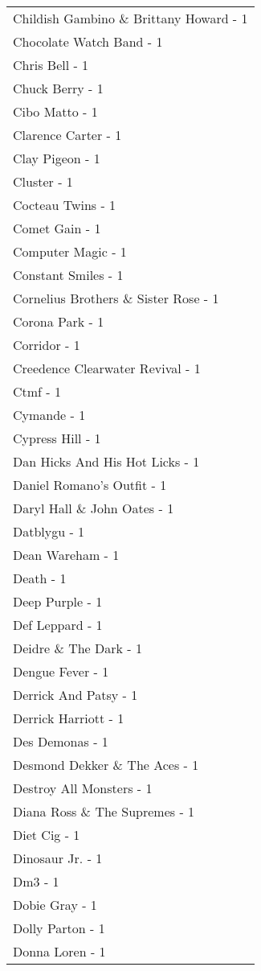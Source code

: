 \documentclass[
]{article}
\begin{document}
\begin{longtable}{l}
Childish Gambino \& Brittany Howard - 1 \\ 
Chocolate Watch Band - 1 \\ 
Chris Bell - 1 \\ 
Chuck Berry - 1 \\ 
Cibo Matto - 1 \\ 
Clarence Carter - 1 \\ 
Clay Pigeon - 1 \\ 
Cluster - 1 \\ 
Cocteau Twins - 1 \\ 
Comet Gain - 1 \\ 
Computer Magic - 1 \\ 
Constant Smiles - 1 \\ 
Cornelius Brothers \& Sister Rose - 1 \\ 
Corona Park - 1 \\ 
Corridor - 1 \\ 
Creedence Clearwater Revival - 1 \\ 
Ctmf - 1 \\ 
Cymande - 1 \\ 
Cypress Hill - 1 \\ 
Dan Hicks And His Hot Licks - 1 \\ 
Daniel Romano's Outfit - 1 \\ 
Daryl Hall \& John Oates - 1 \\ 
Datblygu - 1 \\ 
Dean Wareham - 1 \\ 
Death - 1 \\ 
Deep Purple - 1 \\ 
Def Leppard - 1 \\ 
Deidre \& The Dark - 1 \\ 
Dengue Fever - 1 \\ 
Derrick And Patsy - 1 \\ 
Derrick Harriott - 1 \\ 
Des Demonas - 1 \\ 
Desmond Dekker \& The Aces - 1 \\ 
Destroy All Monsters - 1 \\ 
Diana Ross \& The Supremes - 1 \\ 
Diet Cig - 1 \\ 
Dinosaur Jr. - 1 \\ 
Dm3 - 1 \\ 
Dobie Gray - 1 \\ 
Dolly Parton - 1 \\ 
Donna Loren - 1 \\ 

\end{longtable}
\end{document}
